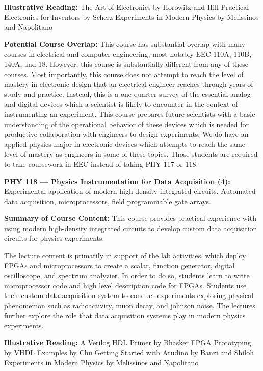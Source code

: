 \documentclass[12pt]{article}
\begin{document}
{\bf Illustrative Reading:}
The Art of Electronics by Horowitz and Hill
Practical Electronics for Inventors by Scherz
Experiments in Modern Physics by Melissinos and Napolitano

{\bf Potential Course Overlap:} This course has substantial overlap
with many courses in electrical and computer engineering, most notably
EEC 110A, 110B, 140A, and 18.  However, this course is substantially
different from any of these courses.  Most importantly, this course
does not attempt to reach the level of mastery in electronic design
that an electrical engineer reaches through years of study and
practice.  Instead, this is a one quarter survey of the essential
analog and digital devices which a scientist is likely to encounter in
the context of instrumenting an experiment.  This course prepares
future scientists with a basic understanding of the operational
behavior of these devices which is needed for productive collaboration
with engineers to design experiments.  We do have an applied physics
major in electronic devices which attempts to reach the same level of
mastery as engineers in some of these topics.  Those students are
required to take coursework in EEC instead of taking PHY 117 or 118.



\vskip 1cm
\noindent 
{\bf PHY 118 --- Physics Instrumentation for Data Acquisition (4):}  
Experimental application of modern high density integrated circuits.
Automated data acquisition,  microprocessors, field programmable gate arrays.

{\bf Summary of Course Content:}
This course provides practical experience with using modern
high-density integrated circuits to develop custom data acquisition
circuits for physics experiments.

The lecture content is primarily in support of the lab activities,
which deploy FPGAs and microprocessors to create a scalar, function
generator, digital oscilloscope, and spectrum analyzier.  In order to
do so, students learn to write microprocessor code and high level
description code for FPGAs.  Students use their custom data
acquisition system to conduct experiments exploring physical
phenomemon such as radioactivity, muon decay, and johnson noise.  The
lectures further explore the role that data acquisition systems play
in modern physics experiments.

{\bf Illustrative Reading:}
A Verilog HDL Primer by Bhasker
FPGA Prototyping by VHDL Examples by Chu
Getting Started with Arudino by Banzi and Shiloh
Experiments in Modern Physics by Melissinos and Napolitano
\end{document}
